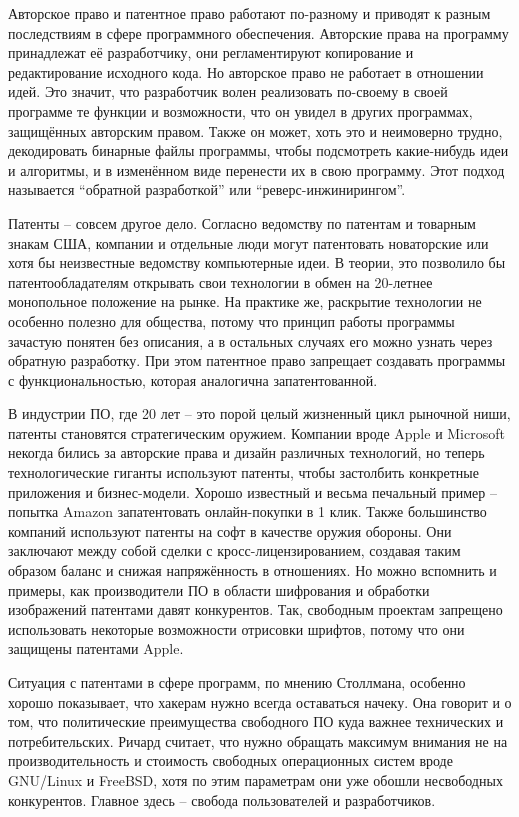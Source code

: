 Авторское право и патентное право работают по-разному и приводят к разным последствиям в сфере программного обеспечения. Авторские права на программу принадлежат её разработчику, они регламентируют копирование и редактирование исходного кода. Но авторское право не работает в отношении идей. Это значит, что разработчик волен реализовать по-своему в своей программе те функции и возможности, что он увидел в других программах, защищённых авторским правом. Также он может, хоть это и неимоверно трудно, декодировать бинарные файлы программы, чтобы подсмотреть какие-нибудь идеи и алгоритмы, и в изменённом виде перенести их в свою программу. Этот подход называется \enquote{обратной разработкой} или \enquote{реверс-инжинирингом}.

Патенты -- совсем другое дело. Согласно ведомству по патентам и товарным знакам США, компании и отдельные люди могут патентовать новаторские или хотя бы неизвестные ведомству компьютерные идеи. В теории, это позволило бы патентообладателям открывать свои технологии в обмен на 20-летнее монопольное положение на рынке. На практике же, раскрытие технологии не особенно полезно для общества, потому что принцип работы программы зачастую понятен без описания, а в остальных случаях его можно узнать через обратную разработку. При этом патентное право запрещает создавать программы с функциональностью, которая аналогична запатентованной.

В индустрии ПО, где 20 лет -- это порой целый жизненный цикл рыночной ниши, патенты становятся стратегическим оружием. Компании вроде Apple и Microsoft некогда бились за авторские права и дизайн различных технологий, но теперь технологические гиганты используют патенты, чтобы застолбить конкретные приложения и бизнес-модели. Хорошо известный и весьма печальный пример -- попытка Amazon запатентовать онлайн-покупки в 1 клик. Также большинство компаний используют патенты на софт в качестве оружия обороны. Они заключают между собой сделки с кросс-лицензированием, создавая таким образом баланс и снижая напряжённость в отношениях. Но можно вспомнить и примеры, как производители ПО в области шифрования и обработки изображений патентами давят конкурентов. Так, свободным проектам запрещено использовать некоторые возможности отрисовки шрифтов, потому что они защищены патентами Apple.

Ситуация с патентами в сфере программ, по мнению Столлмана, особенно хорошо показывает, что хакерам нужно всегда оставаться начеку. Она говорит и о том, что политические преимущества свободного ПО куда важнее технических и потребительских. Ричард считает, что нужно обращать максимум внимания не на производительность и стоимость свободных операционных систем вроде GNU/Linux и FreeBSD, хотя по этим параметрам они уже обошли несвободных конкурентов. Главное здесь -- свобода пользователей и разработчиков.

